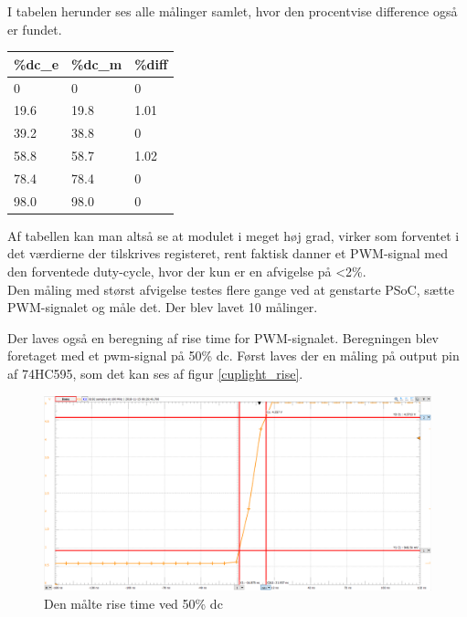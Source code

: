 \documentclass[Modultest/Modultest_main.tex]{subfiles}
\begin{document}
I tabelen herunder ses alle målinger samlet, hvor den procentvise difference også er fundet.

\begin{table}[H]
\centering
\begin{tabular}{|l|l|l|}
\hline
\textbf{\%dc\_e} & \textbf{\%dc\_m} & \textbf{\%diff} \\ \hline
0                & 0                & 0               \\ \hline
19.6             & 19.8             & 1.01            \\ \hline
39.2             & 38.8             & 0               \\ \hline
58.8             & 58.7             & 1.02            \\ \hline
78.4             & 78.4             & 0               \\ \hline
98.0             & 98.0             & 0               \\ \hline
\end{tabular}%
\end{table}

Af tabellen kan man altså se at modulet i meget høj grad, virker som forventet i det værdierne der tilskrives registeret, rent faktisk danner et PWM-signal med den forventede duty-cycle, hvor der kun er en afvigelse på <2\%.\\
Den måling med størst afvigelse testes flere gange ved at genstarte PSoC, sætte PWM-signalet og måle det. Der blev lavet 10 målinger.



Der laves også en beregning af rise time for PWM-signalet.  Beregningen blev foretaget med et pwm-signal på 50\% dc.  Først laves der en måling på output pin af 74HC595, som det kan ses af figur \ref{cuplight_rise}.

\begin{figure}[H]
    \centering
    \includegraphics[width=\textwidth]{Modultest/CupLight/graphics/CupLight_rise_time.png}
    \caption{Den målte rise time ved 50\% dc}
    \label{fig:cuplight_rise}
\end{figure}
\end{document}
